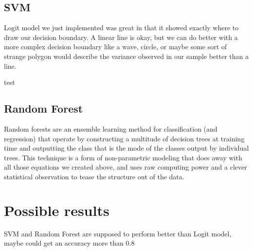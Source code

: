 \documentclass{article}
\begin{document}
\subsection{SVM}

Logit model we just implemented was great in that it showed exactly where to draw our decision boundary. A linear line is okay, but we can do better with a more complex decision boundary like a wave, circle, or maybe some sort of strange polygon would describe the variance observed in our sample better than a line.

test



\subsection{Random Forest}
Random forests are an ensemble learning method for classification (and regression) that operate by constructing a multitude of decision trees at training time and outputting the class that is the mode of the classes output by individual trees. This technique is a form of non-parametric modeling that does away with all those equations we created above, and uses raw computing power and a clever statistical observation to tease the structure out of the data.





\section{Possible results}

SVM and Random Forest are supposed to perform better than Logit model, maybe could get an accuracy more than 0.8
\end{document}
